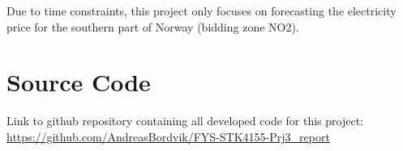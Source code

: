 \documentclass
[twocolumn,
secnumarabic,
nobibnotes,
aps,
prl,
reprint,
groupedaddress,
amsmath,
amssymb,
]{revtex4-2}
\begin{document}
Due to time constraints, this project only focuses on forecasting the electricity price for the southern part of Norway (bidding zone NO2). 

\appendix

\section{Source Code}
\label{sec:sc}
Link to github repository containing all developed code for this project: \url{https://github.com/AndreasBordvik/FYS-STK4155-Prj3_report}





\end{document}
